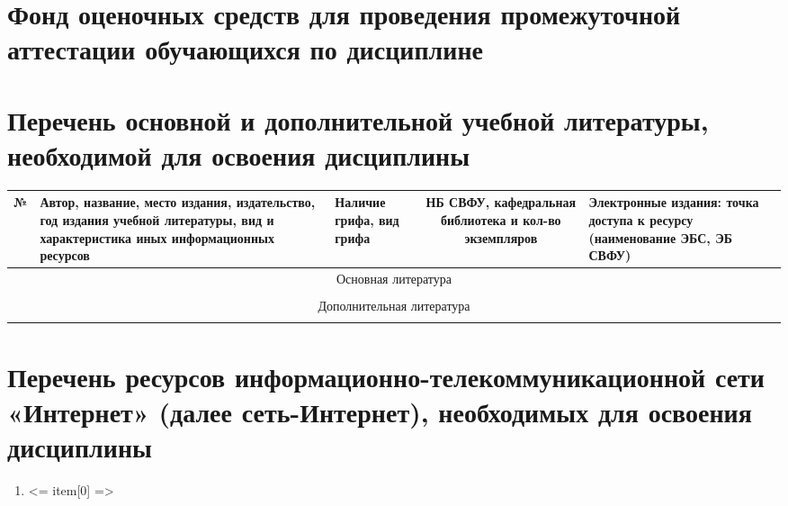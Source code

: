 \documentclass[a4paper,12pt]{article}
\begin{document}
\section{Фонд оценочных средств для проведения промежуточной аттестации обучающихся по дисциплине}

\newpage
\section{Перечень основной и дополнительной учебной литературы, необходимой для освоения дисциплины}

  \begin{table}[H]
  \caption*{Перечень литературы}
  \begin{longtable}{|l|p{7cm}|p{18mm}|c|p{32mm}|}
  \hline
  № & 
  \centering\small\arraybackslash Автор, название, место издания, издательство, год издания учебной литературы, вид и характеристика иных информационных ресурсов &
  \multicolumn{1}{p{18mm}|}{\centering\small\arraybackslash Наличие грифа, вид грифа} &
  \multicolumn{1}{p{21mm}|}{\centering\small\arraybackslash НБ СВФУ, кафедральная библиотека и кол-во экземпляров} & 
  \centering\small\arraybackslash Электронные издания: точка доступа к ресурсу (наименование ЭБС, ЭБ СВФУ)\\
  \hline
  \multicolumn{5}{|c|}{Основная литература}\\
  \hline
  \\
  \hline
  \multicolumn{5}{|c|}{Дополнительная литература}\\
  \hline
  \\
  \hline
  \end{longtable}
  \end{table}
  
\section{Перечень ресурсов информационно-телекоммуникационной сети «Интернет» (далее сеть-Интернет), необходимых для освоения дисциплины}
\begin{enumerate}
  \item <= item[0] => 
\end{enumerate}
\end{document}
